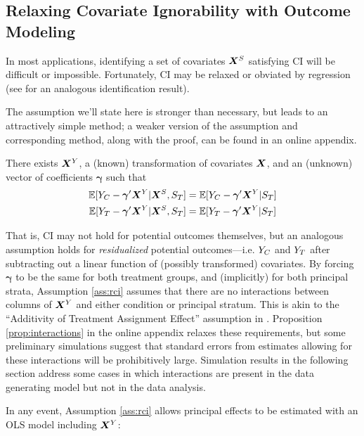 \documentclass{statsoc} %
\begin{document}
\subsection{Relaxing Covariate Ignorability with Outcome Modeling}\label{sec:regression}
In most applications, identifying a set of covariates $\bm{X}^S$ satisfying CI will be difficult or impossible.
Fortunately, CI may be relaxed or obviated by regression (see \citealt[][\S 3.4]{jiangDing2021} for an analogous identification result).

The assumption we'll state here is stronger than necessary, but leads to an attractively simple method; a weaker version of the assumption and corresponding method, along with the proof, can be found in an online appendix.

\begin{ass}\label{ass:rci}
There exists $\bm{X}^Y$, a (known) transformation of covariates $\bm{X}$, and an (unknown) vector of coefficients $\bm{\gamma}$ such that
\begin{equation}\label{eq:ass:rci}
\begin{split}
\mathbb{E}[Y_C-\bm{\gamma}'\bm{X}^Y|\bm{X}^S,S_T]&=\mathbb{E}[Y_C-\bm{\gamma}'\bm{X}^Y|S_T]\\
\mathbb{E}[Y_T-\bm{\gamma}'\bm{X}^Y|\bm{X}^S,S_T]&=\mathbb{E}[Y_T-\bm{\gamma}'\bm{X}^Y|S_T]
\end{split}
\end{equation}
\end{ass}
That is, CI may not hold for potential outcomes themselves, but an analogous assumption holds for \emph{residualized} potential outcomes---i.e. $Y_C$ and $Y_T$ after subtracting out a linear function of (possibly transformed) covariates.
By forcing $\bm{\gamma}$ to be the same for both treatment groups, and (implicitly) for both principal strata, Assumption \ref{ass:rci} assumes that there are no interactions between columns of $\bm{X}^Y$ and either condition or principal stratum.
This is akin to the ``Additivity of Treatment Assignment Effect'' assumption in \citet{jo2002}.
Proposition \ref{prop:interactions} in the online appendix relaxes these requirements, but some preliminary simulations suggest that standard errors from estimates allowing for these interactions will be prohibitively large. 
Simulation results in the following section address some cases in which interactions are present in the data generating model but not in the data analysis. 

In any event, Assumption \ref{ass:rci} allows principal effects to be estimated with an OLS model including $\bm{X}^Y$:
\end{document}
